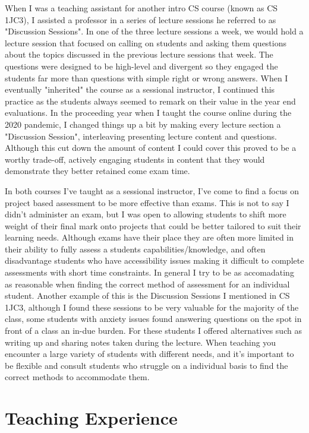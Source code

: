 \documentclass[12pt]{report}
\begin{document}
When I was a teaching assistant for another intro CS course (known as CS
1JC3), I assisted a professor in a series of lecture sessions he referred to
as "Discussion Sessions". In one of the three lecture sessions a week, we
would hold a lecture session that focused on calling on students and asking
them questions about the topics discussed in the previous lecture sessions
that week. The questions were designed to be high-level and divergent so they
engaged the students far more than questions with simple right or wrong
answers. When I eventually "inherited" the course as a sessional instructor, I
continued this practice as the students always seemed to remark on their value
in the year end evaluations. In the proceeding year when I taught the course
online during the 2020 pandemic, I changed things up a bit by making every
lecture section a "Discussion Session", interleaving presenting lecture
content and questions. Although this cut down the amount of content I could
cover this proved to be a worthy trade-off, actively engaging students in
content that they would demonstrate they better retained come exam time. 

In both courses I've taught as a sessional instructor, I've come to find a
focus on project based assessment to be more effective than exams. This is not
to say I didn't administer an exam, but I was open to allowing students to
shift more weight of their final mark onto projects that could be better
tailored to suit their learning needs. Although exams have their place they
are often more limited in their ability to fully assess a students
capabilities/knowledge, and often disadvantage students who have accessibility
issues making it difficult to complete assessments with short time
constraints. In general I try to be as accomadating as reasonable when finding
the correct method of assessment for an individual student. Another example of
this is the Discussion Sessions I mentioned in CS 1JC3, although I found these
sessions to be very valuable for the majority of the class, some students with
anxiety issues found answering questions on the spot in front of a class an
in-due burden. For these students I offered alternatives such as writing up
and sharing notes taken during the lecture. When teaching you encounter a
large variety of students with different needs, and it's important to be
flexible and consult students who struggle on a individual basis to find the
correct methods to accommodate them.


\part{Teaching Experience}
\label{sec:orga4f4326}
\end{document}

